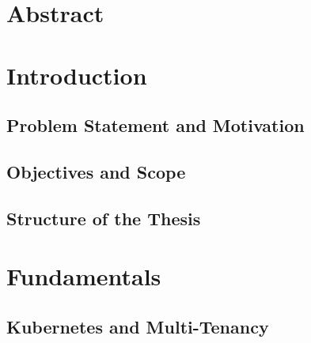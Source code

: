 \documentclass[11pt, a4paper, oneside, listof=totoc]{scrartcl}
\begin{document}
    \section*{Abstract}\label{abstract}

    \newpage

    \printglossary[type=\acronymtype, title={Acronyms}]
    \cleardoublepage{}
    \printglossary[title={Glossary}]


    \cleardoublepage{}

    \begingroup
        \tableofcontents
    \endgroup

    \newpage

    \cleardoublepage{}
    \begingroup
        \renewcommand{\addcontentsline}[3]{}
        \listoffigures
    \endgroup

    \cleardoublepage{}
    \begingroup
        \renewcommand{\addcontentsline}[3]{}
        \listoftables{}
    \endgroup

    \newpage


    \section{Introduction}\label{sec:introduction}

        \subsection{Problem Statement and Motivation}\label{subsec:problem}

        \subsection{Objectives and Scope}\label{subsec:objectives}

        \subsection{Structure of the Thesis}\label{subsec:structure}

    \section{Fundamentals}

        \subsection{Kubernetes and Multi-Tenancy}\label{subsec:k8sAndMultiTenancy}
\end{document}
